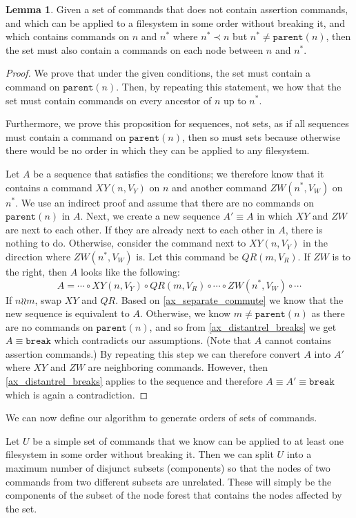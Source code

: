 \documentclass[12pt]{article}
\newcommand{\parent}{\mathtt{parent}}
\newcommand{\nn}{n^*} %
\newcommand{\cbrk}{\mathtt{break}} %
\newcommand{\fscommand}[2]{{#1#2}}
\newcommand{\cxy}{\fscommand{X}{Y}}
\newcommand{\czw}{\fscommand{Z}{W}}
\newcommand{\cqr}{\fscommand{Q}{R}}
\newcommand{\cc}{\circ} %
\newcommand{\descendant}{\prec}
\newcommand{\indep}{\mathrel{\wr\wr}} %
\newcommand{\unrel}{\indep} %
\theoremstyle{definition}
\newtheorem{mylem}{Lemma}
\begin{document}
\begin{mylem}\label{connected_changes}
Given a set of commands that
does not contain assertion commands,
and which can be applied to a filesystem in some order without breaking it,
and which contains commands on $n$ and $\nn$ where $\nn\descendant n$
but $\nn\neq\parent(n)$, then the set must also contain a commands
on each node between $n$ and $\nn$.
\end{mylem}
\begin{proof}
We prove that under the given conditions, the set must contain a command on $\parent(n)$.
Then, by repeating this statement, we how that the set must contain commands on every
ancestor of $n$ up to $\nn$.

Furthermore,
we prove this proposition for sequences, not sets, as if all sequences must contain a command on $\parent(n)$,
then so must sets because otherwise there would be no order in which they can be
applied to any filesystem.

Let $A$ be a sequence that satisfies the conditions;
we therefore know that it contains a command $\cxy(n,V_Y)$ on $n$
and another command $\czw(\nn,V_W)$ on $\nn$.
We use an indirect proof and assume that there are no commands on $\parent(n)$ in $A$.
Next, we create a new sequence $A'\equiv A$ in which $\cxy$ and $\czw$ are next to each other.
If they are already next to each other in $A$, there is nothing to do.
Otherwise, consider the command next to $\cxy(n,V_Y)$ in the direction where $\czw(\nn,V_W)$ is.
Let this command be $\cqr(m,V_R)$.
If $\czw$ is to the right, then $A$ looks like the following:
\[ A = \cdots\cc\cxy(n,V_Y)\cc\cqr(m,V_R)\cc\cdots\cc\czw(\nn,V_W)\cc\cdots \]
If $n\unrel m$, swap $\cxy$ and $\cqr$. Based on \cref{ax_separate_commute} we know that the new
sequence is equivalent to $A$.
Otherwise, we know $m\neq\parent(n)$ as there are no commands on $\parent(n)$, and so
from \cref{ax_distantrel_breaks} we get $A\equiv\cbrk$ which contradicts our assumptions.
(Note that $A$ cannot contains assertion commands.)
By repeating this step we can therefore convert $A$ into $A'$ where $\cxy$ and $\czw$ are neighboring commands.
However, then \cref{ax_distantrel_breaks} applies to the sequence and therefore $A\equiv A'\equiv\cbrk$ which
is again a contradiction.
\end{proof}

\medskip

We can now define our algorithm to generate orders of sets of commands.

Let $U$ be a simple set of commands
that we know can be applied to at least one filesystem in some order without breaking it.
Then we can split $U$ into a maximum number of disjunct subsets
(components) so that the nodes of two commands from two different subsets are unrelated.
These will simply be the components of the subset of the node forest that contains the nodes affected by the set.
\end{document}
